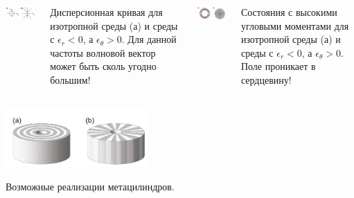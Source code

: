 \documentclass[9pt, compress, xcolor=table]{beamer}
\begin{document}
\begin{frame}{}
\begin{columns}[c]

\column{6cm}
\begin{center}
\includegraphics[width=5.5cm]{neg_ref_44}
\end{center}
Дисперсионная кривая для изотропной среды (а) и среды с $\epsilon_r<0$, а
$\epsilon_{\theta}>0$.  Для данной частоты волновой вектор может быть сколь угодно большим!

\column{6cm}
\begin{center}
\includegraphics[width=5.5cm]{neg_ref_45}
\end{center}

Состояния с высокими угловыми моментами для изотропной среды (а) и среды с $\epsilon_r<0$, а
$\epsilon_{\theta}>0$. Поле проникает в сердцевину!

\end{columns}

\begin{center}
\includegraphics[width=5.5cm]{neg_ref_46}
\end{center}

 Возможные реализации метацилиндров.

\end{frame}
\end{document}
